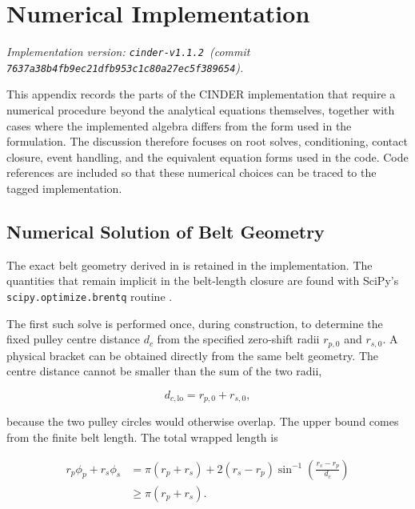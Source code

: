 \documentclass[11pt]{report}
\numberwithin{equation}{section}
\newcommand{\CINDERtag}{\texttt{cinder-v1.1.2}}
\newcommand{\CINDERcommit}{\texttt{7637a38b4fb9ec21dfb953c1c80a27ec5f389654}}
\begin{document}
\chapter{Numerical Implementation}
\label{app:numerical_implementation}

\noindent\textit{Implementation version: \CINDERtag\ (commit \CINDERcommit).}

This appendix records the parts of the CINDER implementation that require a
numerical procedure beyond the analytical equations themselves, together with
cases where the implemented algebra differs from the form used in the
formulation.  The discussion therefore focuses on root solves, conditioning,
contact closure, event handling, and the equivalent equation forms used in the
code.  Code references are included so that these numerical choices can be
traced to the tagged implementation.

\section{Numerical Solution of Belt Geometry}
\label{app:num_geometry}

The exact belt geometry derived in
 is retained in the
implementation.  The quantities that remain implicit in the belt-length
closure are found with SciPy's \texttt{scipy.optimize.brentq} routine
\citep{Virtanen2020}.

The first such solve is performed once, during construction, to determine the
fixed pulley centre distance $d_c$ from the specified zero-shift radii
$r_{p,0}$ and $r_{s,0}$.  A physical bracket can be obtained directly from the
same belt geometry.  The centre distance cannot be smaller than the sum of the
two radii,

\begin{equation}
    d_{c,\mathrm{lo}}=r_{p,0}+r_{s,0},
    \label{eq:appendix_center_distance_lower_bound}
\end{equation}

because the two pulley circles would otherwise overlap.  The upper bound comes
from the finite belt length. The total wrapped length is

\begin{equation}
\begin{aligned}
    r_p\phi_p+r_s\phi_s
    & = \pi(r_p+r_s)
      +2(r_s-r_p)\sin^{-1}\!\left(\frac{r_s-r_p}{d_c}\right)\\
    & \geq \pi(r_p+r_s).
\end{aligned}
\label{eq:appendix_minimum_wrapped_length}
\end{equation}
\end{document}
